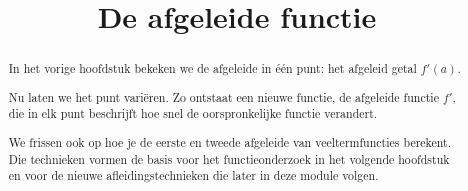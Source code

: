 \documentclass{ximera}
\title{De afgeleide functie}
\begin{document}





































































































\begin{abstract}
In het vorige hoofdstuk bekeken we de afgeleide in één punt:
het afgeleid getal $f'(a)$.

Nu laten we het punt variëren.
Zo ontstaat een nieuwe functie, de afgeleide functie $f'$,
die in elk punt beschrijft hoe snel de oorspronkelijke functie verandert.

We frissen ook op hoe je de eerste en tweede afgeleide van
veeltermfuncties berekent. Die technieken vormen de basis voor het
functieonderzoek in het volgende hoofdstuk en voor de nieuwe
afleidingstechnieken die later in deze module volgen.
\end{abstract}
\end{document}
